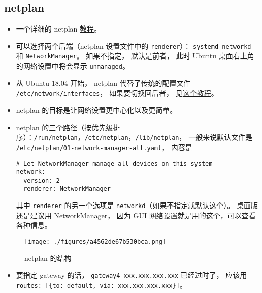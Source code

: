 \subsection{netplan}
\begin{itemize}
\item 一个详细的 netplan \href{https://linuxconfig.org/netplan-network-configuration-tutorial-for-beginners}{教程}。
\item 可以选择两个后端（netplan 设置文件中的 \verb|renderer|）： \verb|systemd-networkd| 和 \verb|NetworkManager|。 如果不指定， 默认是前者， 此时 Ubuntu 桌面右上角的网络设置中将会显示 \verb|unmanaged|。
\item 从 Ubuntu 18.04 开始， netplan 代替了传统的配置文件 \verb|/etc/network/interfaces|， 如果要切换回后者， 见\href{https://linuxconfig.org/how-to-switch-back-networking-to-etc-network-interfaces-on-ubuntu-20-04-focal-fossa-linux}{这个教程}。
\item netplan 的目标是让网络设置更中心化以及更简单。
\item netplan 的三个路径（按优先级排序）：\verb|/run/netplan|，\verb|/etc/netplan|，\verb|/lib/netplan|， 一般来说默认文件是 \verb|/etc/netplan/01-network-manager-all.yaml|， 内容是
\begin{lstlisting}[language=none]
# Let NetworkManager manage all devices on this system
network:
  version: 2
  renderer: NetworkManager
\end{lstlisting}
其中 \verb|renderer| 的另一个选项是 \verb|networkd|（如果不指定就默认这个）。 桌面版还是建议用 NetworkManager， 因为 GUI 网络设置就是用的这个，可以查看各种信息。
\end{itemize}

\begin{figure}[ht]
\centering
\texttt{[image: ./figures/a4562de67b530bca.png]}
\caption{netplan 的结构} \label{fig_LinWeb_1}
\end{figure}

\begin{itemize}
\item 要指定 gateway 的话， \verb|gateway4 xxx.xxx.xxx.xxx| 已经过时了， 应该用 \verb|routes: [{to: default, via: xxx.xxx.xxx.xxx}]|。
\end{itemize}

